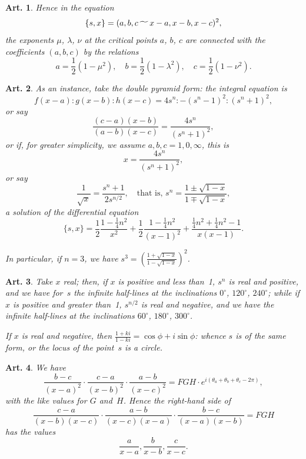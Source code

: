 \documentclass[11pt,a4paper]{article}
\theoremstyle{plain}
\newtheorem{art}{Art.}[section]
\begin{document}
\begin{art}
Hence in the equation
\[
\{s, x\} = (a, b, c \,\raisebox{-.5ex}{$\widetilde{\phantom{aa}}$}\, x-a, x-b, x-c)^2,
\]
the exponents $\mu$, $\lambda$, $\nu$ at the critical points $a$, $b$, $c$ are connected
with the coefficients $(a, b, c)$ by the relations
\[
a = \frac{1}{2}(1 - \mu^2), \quad b = \frac{1}{2}(1 - \lambda^2), \quad c = \frac{1}{2}(1 - \nu^2).
\]
\end{art}

\begin{art}
As an instance, take the double pyramid form: the integral equation is
\[
f(x-a) : g(x-b) : h(x-c) = 4s^n : -(s^n-1)^2 : (s^n+1)^2,
\]
or say
\[
\frac{(c-a)(x-b)}{(a-b)(x-c)} = \frac{4s^n}{(s^n+1)^2},
\]
or if, for greater simplicity, we assume $a, b, c = 1, 0, \infty$, this is
\[
x = \frac{4s^n}{(s^n+1)^2},
\]
or say
\[
\frac{1}{\sqrt{x}} = \frac{s^n+1}{2s^{n/2}}, \quad \text{that is, } s^n = \frac{1 \pm \sqrt{1-x}}{1 \mp \sqrt{1-x}},
\]
a solution of the differential equation
\[
\{s, x\} = \frac{1}{2}\frac{1-\frac{1}{4}n^2}{x^2} + \frac{1}{2}\frac{1-\frac{1}{4}n^2}{(x-1)^2} + \frac{\frac{1}{4}n^2 + \frac{1}{4}n^2 - 1}{x(x-1)}.
\]

In particular, if $n = 3$, we have $s^3 = \left(\frac{1+\sqrt{1-x}}{1-\sqrt{1-x}}\right)^2$.
\end{art}

\begin{art}
Take $x$ real; then, if $x$ is positive and less than~1, $s^n$ is real and
positive, and we have for~$s$ the infinite half-lines at the inclinations
$0^\circ$, $120^\circ$, $240^\circ$; while if $x$ is positive and greater than~1,
$s^{n/2}$ is real and negative, and we have the infinite half-lines at the
inclinations $60^\circ$, $180^\circ$, $300^\circ$.

If $x$ is real and negative, then $\frac{1+ki}{1-ki} = \cos\phi + i\sin\phi$: whence
$s$ is of the same form, or the locus of the point~$s$ is a circle.
\end{art}

\begin{art}
We have
\[
\frac{b-c}{(x-a)^2} \cdot \frac{c-a}{(x-b)^2} \cdot \frac{a-b}{(x-c)^2} = FGH \cdot e^{i(\theta_a + \theta_b + \theta_c - 2\pi)},
\]
with the like values for $G$ and~$H$. Hence the right-hand side of
\[
\frac{c-a}{(x-b)(x-c)} \cdot \frac{a-b}{(x-c)(x-a)} \cdot \frac{b-c}{(x-a)(x-b)} = FGH
\]
has the values
\[
\frac{a}{x-a}, \frac{b}{x-b}, \frac{c}{x-c}.
\]
\end{art}
\end{document}
